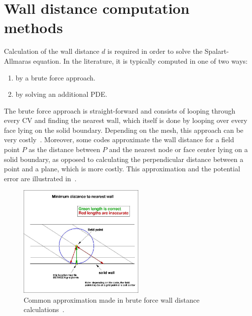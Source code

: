 \section{Wall distance computation methods}
\label{sec:walldist}
Calculation of the wall distance $d$ is required in order to solve the Spalart-Allmaras equation. In the literature, it is typically computed in one of two ways:
\begin{enumerate}
    \item by a brute force approach.
    \item by solving an additional PDE.
\end{enumerate}
The brute force approach is straight-forward and consists of looping through every CV and finding the nearest wall, which itself is done by looping over every face lying on the solid boundary. Depending on the mesh, this approach can be very costly~\cite{tucker2005computations}. Moreover, some codes approximate the wall distance for a field point $P$ as the distance between $P$ and the nearest node or face center lying on a solid boundary, as opposed to calculating the perpendicular distance between a point and a plane, which is more costly. This approximation and the potential error are illustrated in~.
\begin{figure}
    \centering
    \includegraphics[width=0.55\textwidth]{figs/mindist}
    \caption{Common approximation made in brute force wall distance calculations~\cite{tmr}.}
    \label{fig:nasawalldist}
\end{figure}

